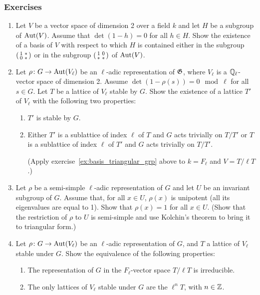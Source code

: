 \subsubsection*{Exercises}
\begin{enumerate}
	\item\label{ex:basis_triangular_grp}
		Let $V$ be a vector space of dimension 2 over a field $k$
		and let $H$ be a subgroup of $\operatorname{Aut}(V)$. Assume that $\det(1-h)
		= 0$ for all $h \in H$. Show the existence of a basis of $V$
		with respect to which $H$ is contained either in the subgroup $
		\begin{psmallmatrix}
			1 & * \\
			0 & *
		\end{psmallmatrix}
		$ or in the subgroup $
		\begin{psmallmatrix}
			1 & 0 \\
			* & *
		\end{psmallmatrix}
		$ of $\operatorname{Aut}(V)$.
	\item\label{ex:I11_ex2}
		Let $\rho \colon G \to \operatorname{Aut}(V_\ell)$ be an $\ell$-adic
		representation of $\mathfrak{G}$, where $V_\ell$ is a $\mathbb{Q}_\ell$-vector
		space of dimension 2. Assume $\det(1-\rho(s))= 0 \mod\ell$ for
		all $s \in G$. Let $T$ be a lattice of $V_\ell$ stable by $G$.
		Show the existence of a lattice $T'$ of $V_\ell$ with the
		following two properties:
	\begin{enumerate}
		\item $T'$ is stable by $G$.
		\item Either $T'$ is a sublattice of index $\ell$ of $T$ and $G$
			\dpage
			acts trivially on $T/T'$ or $T$ is a sublattice of
			index $\ell$ of $T'$ and $G$ acts trivially on $T/T'$.
			\label{errata:t't}

			(Apply exercise~\ref{ex:basis_triangular_grp} above to
			$k = F_\ell$ and $V = T/\ell T$.)

	\end{enumerate}
		\item Let $\rho$ be a semi-simple $\ell$-adic representation of
			$G$ and let $U$ be an invariant subgroup of $G$.
			Assume that, for all $x \in U$, $\rho(x)$ is unipotent
			(all its eigenvalues are equal to 1). Show that
			$\rho(x) = 1$ for all $x \in U$. (Show that the
			restriction of $\rho$ to $U$ is semi-simple and use
			Kolchin's theorem to bring it to triangular form.)
		\item Let $\rho \colon G \to \operatorname{Aut}(V_\ell)$ be an $\ell$-adic
			representation of $G$, and $T$ a lattice of $V_\ell$
			stable under $G$. Show the equivalence of the following
			properties:
		\begin{enumerate}
			\item The representation of $G$ in the $F_\ell$-vector
				space $T/\ell T$ is irreducible.
			\item The only lattices of $V_\ell$ stable under $G$
				are the $\ell^n T$, with $n \in \mathbb{Z}$.
		\end{enumerate}
\end{enumerate}

